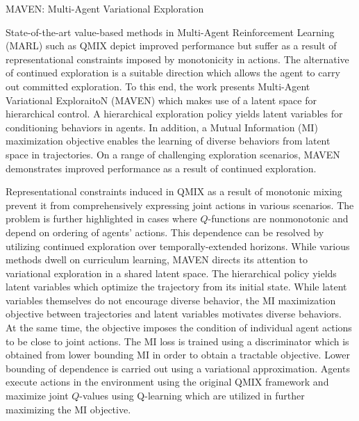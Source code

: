 \documentclass[11pt,letterpaper]{article}
\begin{document}
\begin{center}
  \large{MAVEN: Multi-Agent Variational Exploration}
\end{center}

State-of-the-art value-based methods in Multi-Agent Reinforcement Learning (MARL) such as QMIX depict improved performance but suffer as a result of representational constraints imposed by monotonicity in actions. The alternative of continued exploration is a suitable direction which allows the agent to carry out committed exploration. To this end, the work presents Multi-Agent Variational ExploraitoN (MAVEN) which makes use of a latent space for hierarchical control. A hierarchical exploration policy yields latent variables for conditioning behaviors in agents. In addition, a Mutual Information (MI) maximization objective enables the learning of diverse behaviors from latent space in trajectories. On a range of challenging exploration scenarios, MAVEN demonstrates improved performance as a result of continued exploration. 

Representational constraints induced in QMIX as a result of monotonic mixing prevent it from comprehensively expressing joint actions in various scenarios. The problem is further highlighted in cases where $Q$-functions are nonmonotonic and depend on ordering of agents' actions. This dependence can be resolved by utilizing continued exploration over temporally-extended horizons. While various methods dwell on curriculum learning, MAVEN directs its attention to variational exploration in a shared latent space. The hierarchical policy yields latent variables which optimize the trajectory from its initial state. While latent variables themselves do not encourage diverse behavior, the MI maximization objective between trajectories and latent variables motivates diverse behaviors. At the same time, the objective imposes the condition of individual agent actions to be close to joint actions. The MI loss is trained using a discriminator which is obtained from lower bounding MI in order to obtain a tractable objective. Lower bounding of dependence is carried out using a variational approximation. Agents execute actions in the environment using the original QMIX framework and maximize joint $Q$-values using Q-learning which are utilized in further maximizing the MI objective.    
\end{document}
